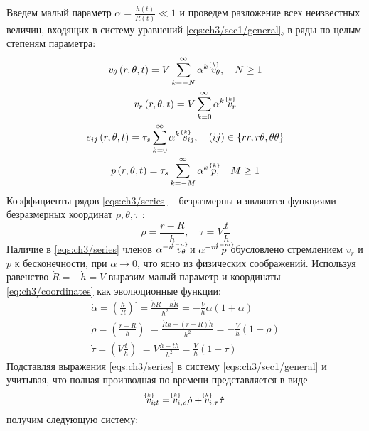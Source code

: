 Введем малый параметр $\alpha = \frac{h(t)}{R(t)} \ll 1$ и проведем разложение всех неизвестных величин, входящих в систему уравнений \cref{eqs:ch3/sec1/general}, в ряды по целым степеням параметра:
\begin{subequations}
  \label{eqs:ch3/series}
  \begin{gather}
    v_{\theta}\left(r, \theta, t\right) = V \sum_{k=-N}^{\infty}{\alpha^{k} \; \uindex{v}{k}_{\theta}}, \quad N \ge 1
    \\
    v_{r}\left(r, \theta, t\right) = V \sum_{k=0}^{\infty}{\alpha^{k} \; \uindex{v}{k}_{r}}
    \\
    s_{ij}\left(r, \theta, t\right) = \tau_{s} \sum_{k=0}^{\infty}{\alpha^{k} \; \uindex{s}{k}_{ij}}, \quad (ij)\in\{rr, r\theta, \theta\theta\}
    \\
    p\left(r, \theta, t \right) = \tau_{s} \sum_{k=-M}^{\infty}{\alpha^{k} \; \uindex{p}{k}}, \quad M \ge 1
  \end{gather}
\end{subequations}
Коэффициенты рядов \cref{eqs:ch3/series} -- безразмерны и являются функциями безразмерных координат $\rho, \theta, \tau$ :
\begin{equation}
  \label{eq:ch3/coordinates}
  \rho = \frac{r-R}{h}, \quad \tau = V \frac{t}{h}
\end{equation}
Наличие в \cref{eqs:ch3/series} членов $\alpha^{-n} \; \uindex{v}{-n}_{\theta}$ и $\alpha^{-m} \; \uindex{p}{-m}$ обусловлено стремлением $v_{r}$ и $p$ к бесконечности, при $\alpha\rightarrow 0$, что ясно из физических соображений.
Используя равенство $\dot{R}=-\dot{h}= V$ выразим малый параметр и координаты \cref{eq:ch3/coordinates} как эволюционные функции:
\begin{subequations}
  \begin{gather}
    \dot{\alpha} = \left(\frac{h}{R}\right)^. = \frac{\dot{h}R - h\dot{R}}{h^2} = -\frac{V}{h} \alpha \left(1+\alpha\right)
    \\
    \dot{\rho} = \left(\frac{r-R}{h}\right)^. = \frac{\dot{R} h - \left(r-R\right) \dot{h}}{h^2} = -\frac{V}{h}\left(1-\rho\right)
    \\
    \dot{\tau} = \left(V \frac{t}{h}\right)^. = V \frac{h - t\dot{h}}{h^2} = \frac{V}{h} \left(1+\tau\right)
  \end{gather}
\end{subequations}
Подставляя выражения \cref{eqs:ch3/series} в систему \cref{eqs:ch3/sec1/general} и учитывая, что полная производная по времени представляется в виде
\begin{equation*}
  \uindex{v}{k}_{i;t} = \uindex{v}{k}_{i,\rho} \dot{\rho} + \uindex{v}{k}_{i,\tau} \dot{\tau}
\end{equation*}
получим следующую систему:

